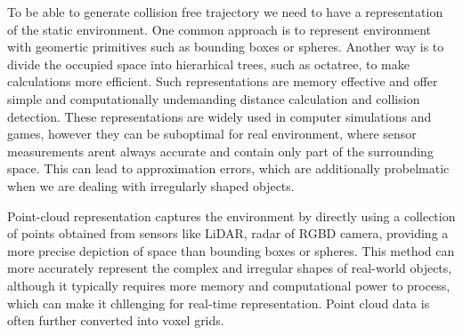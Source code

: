\documentclass[letterpaper, 10 pt, conference]{ieeeconf}  %
\begin{document}




To be able to generate collision free trajectory we need to have a representation of the static environment. One common approach is to represent environment with geomertic primitives such as bounding boxes or spheres. Another way is to divide the occupied space into hierarhical trees, such as octatree, to make calculations more efficient. Such representations are memory effective and offer simple and computationally undemanding distance calculation and collision detection. These representations are widely used in computer simulations and games, however they can be suboptimal for real environment, where sensor measurements arent always accurate and contain only part of the surrounding space. This can lead to approximation errors, which are additionally probelmatic when we are dealing with irregularly shaped objects.

Point-cloud representation captures the environment by directly using a collection of points obtained from sensors like LiDAR, radar of RGBD camera, providing a more precise depiction of space than bounding boxes or spheres. This method can more accurately represent the complex and irregular shapes of real-world objects, although it typically requires more memory and computational power to process, which can make it chllenging for real-time representation. Point cloud data is often further converted into voxel grids.
\end{document}
